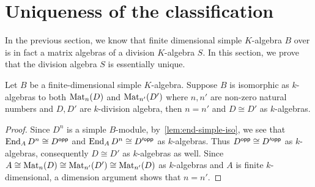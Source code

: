 \section{Uniqueness of the classification}\label{sec:wed-artin-unique}
In the previous section, we know that finite dimensional simple $K$-algebra $B$ over is in fact a matrix algebras of a division $K$-algebra $S$. In this section, we prove that the division algebra $S$ is essentially unique.

\begin{theorem} Let $B$ be a finite-dimensional simple $K$-algebra. Suppose $B$ is isomorphic as $k$-algebras to both $\operatorname{Mat}_{n}(D)$ and $\operatorname{Mat}_{n'}(D')$ where $n, n'$ are non-zero natural numbers and $D, D'$ are $k$-division algebra, then $n = n'$ and $D \cong D'$ as $k$-algebras.\label{thm:wed-artin-unique}
  \leanok
\end{theorem}

\begin{proof}
  Since $D^{n}$ is a simple $B$-module, by~\cref{lem:end-simple-iso}, we see that $\operatorname{End}_{A}D^{n}\cong D^{\mathsf{opp}}$ and $\operatorname{End}_{A}D^{n}\cong D'^{\mathsf{opp}}$ as $k$-algebras. Thus $D^{\mathsf{opp}}\cong D'^{\mathsf{opp}}$ as $k$-algebras, consequently $D\cong D'$ as $k$-algebras as well. Since $A \cong \operatorname{Mat}_{n}(D)\cong \operatorname{Mat}_{n'}(D')\cong \operatorname{Mat}_{n'}(D)$ as $k$-algebras and $A$ is finite $k$-dimensional, a dimension argument shows that $n=n'$.
\end{proof}

